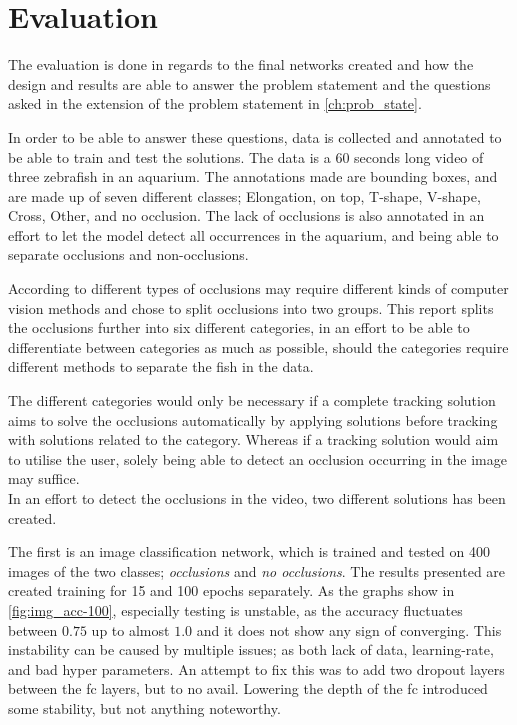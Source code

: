 \chapter{Evaluation}
The evaluation is done in regards to the final networks created and how the design and results are able to answer the problem statement and the questions asked in the extension of the problem statement in \autoref{ch:prob_state}.

In order to be able to answer these questions, data is collected and annotated to be able to train and test the solutions. The data is a 60 seconds long video of three zebrafish in an aquarium. The annotations made are bounding boxes, and are made up of seven different classes; Elongation, on top, T-shape, V-shape, Cross, Other, and no occlusion. The lack of occlusions is also annotated in an effort to let the model detect all occurrences in the aquarium, and being able to separate occlusions and non-occlusions. 

According to \cite{Dolado2014} different types of occlusions may require different kinds of computer vision methods and chose to split occlusions into two groups. This report splits the occlusions further into six different categories, in an effort to be able to differentiate between categories as much as possible, should the categories require different methods to separate the fish in the data.

The different categories would only be necessary if a complete tracking solution aims to solve the occlusions automatically by applying solutions before tracking with solutions related to the category. Whereas if a tracking solution would aim to utilise the user, solely being able to detect an occlusion occurring in the image may suffice.\\

In an effort to detect the occlusions in the video, two different solutions has been created. 

The first is an image classification network, which is trained and tested on 400 images of the two classes; \textit{occlusions} and \textit{no occlusions}. The results presented are created training for 15 and 100 epochs separately. As the graphs show in \autoref{fig:img_acc-100}, especially testing is unstable, as the accuracy fluctuates between $0.75$ up to almost $1.0$ and it does not show any sign of converging. This instability can be caused by multiple issues; as both lack of data, learning-rate, and bad hyper parameters. An attempt to fix this was to add two dropout layers between the \gls{fc} layers, but to no avail. Lowering the depth of the \gls{fc} introduced some stability, but not anything noteworthy.

